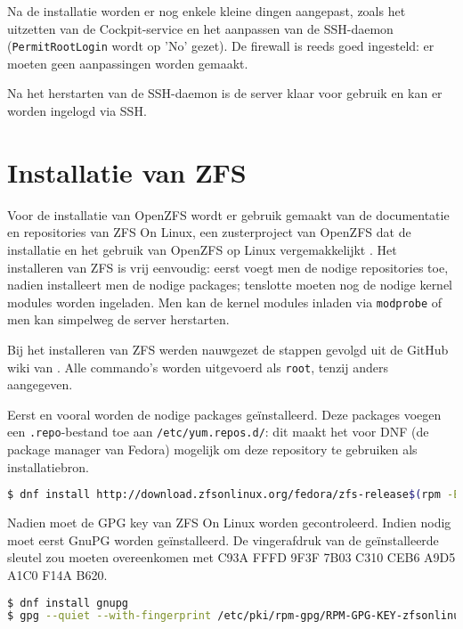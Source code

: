 Na de installatie worden er nog enkele kleine dingen aangepast, zoals het uitzetten van de Cockpit-service en het aanpassen van de SSH-daemon (\texttt{PermitRootLogin} wordt op 'No' gezet). De firewall is reeds goed ingesteld: er moeten geen aanpassingen worden gemaakt.

Na het herstarten van de SSH-daemon is de server klaar voor gebruik en kan er worden ingelogd via SSH.

\section{Installatie van ZFS}

Voor de installatie van OpenZFS wordt er gebruik gemaakt van de documentatie en repositories van ZFS On Linux, een zusterproject van OpenZFS dat de installatie en het gebruik van OpenZFS op Linux vergemakkelijkt \autocite{ZFSOL2017}. Het installeren van ZFS is vrij eenvoudig: eerst voegt men de nodige repositories toe, nadien installeert men de nodige packages; tenslotte moeten nog de nodige kernel modules worden ingeladen. Men kan de kernel modules inladen via \texttt{modprobe} of men kan simpelweg de server herstarten. 

Bij het installeren van ZFS werden nauwgezet de stappen gevolgd uit de GitHub wiki van \textcite{ZFSOL2016}. Alle commando's worden uitgevoerd als \texttt{root}, tenzij anders aangegeven.

\clearpage

Eerst en vooral worden de nodige packages geïnstalleerd. Deze packages voegen een \texttt{.repo}-bestand toe aan \texttt{/etc/yum.repos.d/}: dit maakt het voor DNF (de package manager van Fedora) mogelijk om deze repository te gebruiken als installatiebron.

\begin{lstlisting}[language=bash,style=command_style]
$ dnf install http://download.zfsonlinux.org/fedora/zfs-release$(rpm -E %dist).noarch.rpm
\end{lstlisting}

Nadien moet de GPG key van ZFS On Linux worden gecontroleerd. Indien nodig moet eerst GnuPG worden geïnstalleerd. De vingerafdruk van de geïnstalleerde sleutel zou moeten overeenkomen met C93A FFFD 9F3F 7B03 C310  CEB6 A9D5 A1C0 F14A B620.

\begin{lstlisting}[language=bash,style=command_style]
$ dnf install gnupg
$ gpg --quiet --with-fingerprint /etc/pki/rpm-gpg/RPM-GPG-KEY-zfsonlinux
\end{lstlisting}

